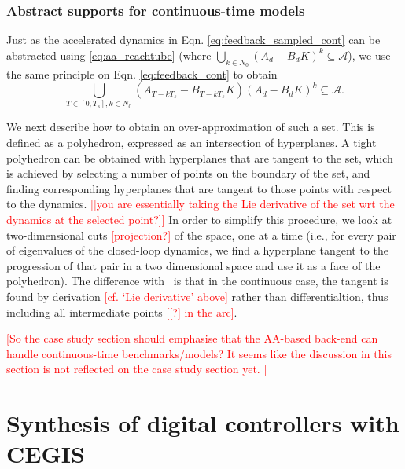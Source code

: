 \documentclass[twocolumn]{autart}    %
\newcommand{\mat}[1]{{#1}}
\renewcommand{\note}[1]{\textcolor{red}{[#1]}}
\begin{document}
 \subsubsection{Abstract supports for continuous-time models}
 \label{sec:cont_aasup}

Just as the accelerated dynamics in Eqn. \eqref{eq:feedback_sampled_cont} can be abstracted using \eqref{eq:aa_reachtube} (where $\bigcup_{k \in N_0} (\mat{A}_d-\mat{B}_d\mat{K}) ^k \subseteq \mathcal{A}$), 
we use the same principle on Eqn. \eqref{eq:feedback_cont} to obtain 
\begin{equation}\label{eq:aa_cont_amatrix}
\bigcup_{T \in [0, T_s], k \in N_0} (\mat{A}_{T-kT_s}-\mat{B}_{T-kT_s}\mat{K}) (\mat{A}_d-\mat{B}_d\mat{K})^k \subseteq \mathcal{A}.
\end{equation}

We next describe how to obtain an over-approximation of such a set. 
This is defined as a polyhedron, expressed as an intersection of hyperplanes. 
A tight polyhedron can be obtained with hyperplanes that are tangent to the set,  
which is achieved by selecting a number of points on the boundary of the set, 
and finding corresponding hyperplanes that are tangent to those points with respect to the dynamics.  
\note{[you are essentially taking the Lie derivative of the set wrt the dynamics at the selected point?]}
In order to simplify this procedure, we look at two-dimensional cuts \note{projection?} of the space, one at a time (i.e., for every pair
of eigenvalues of the closed-loop dynamics, we find a hyperplane tangent to
the progression of that pair in a two dimensional space and use it as a face of
the polyhedron).  The difference with~\cite{cattaruzza2015unbounded} is that
in the continuous case, the tangent is found by derivation \note{cf. `Lie derivative' above} rather than
differentialtion, thus including all intermediate points \note{[?] in the arc}. 

\note{So the case study section should emphasise that the AA-based back-end can handle continuous-time benchmarks/models? 
It seems like the discussion in this section is not reflected on the case study section yet. } 

\fi
\section{Synthesis of digital controllers with CEGIS} 
\label{sssec:cegisdig}
\end{document}
